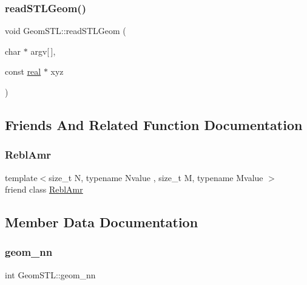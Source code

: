 \subsubsection{\texorpdfstring{read\+S\+T\+L\+Geom()}{readSTLGeom()}}
{\footnotesize\ttfamily void Geom\+S\+T\+L\+::read\+S\+T\+L\+Geom (\begin{DoxyParamCaption}\item[{char $\ast$}]{argv\mbox{[}$\,$\mbox{]},  }\item[{const \mbox{\hyperlink{definitions_8h_aedc0ad84d1e764530814f57ad931d02a}{real}} $\ast$}]{xyz }\end{DoxyParamCaption})}



\subsection{Friends And Related Function Documentation}
\mbox{\label{classGeomSTL_a8d90a8b4dd53f0733e15d6eed6d2dcdd}} 
\subsubsection{\texorpdfstring{Rebl\+Amr}{ReblAmr}}
{\footnotesize\ttfamily template$<$size\+\_\+t N, typename Nvalue , size\+\_\+t M, typename Mvalue $>$ \\
friend class \mbox{\hyperlink{classReblAmr}{Rebl\+Amr}}\hspace{0.3cm}{\ttfamily [friend]}}



\subsection{Member Data Documentation}
\mbox{\label{classGeomSTL_ae5999187224ca4a905f6281f83ad10d4}} 
\subsubsection{\texorpdfstring{geom\+\_\+nn}{geom\_nn}}
{\footnotesize\ttfamily int Geom\+S\+T\+L\+::geom\+\_\+nn\hspace{0.3cm}{\ttfamily [private]}}

\mbox{\label{classGeomSTL_aa042c614009a5473c8bd34bf6cda0561}} 
